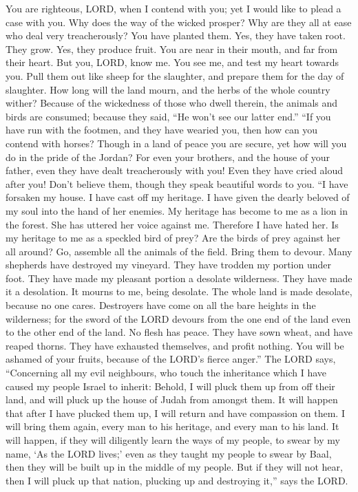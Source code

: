  You are righteous, LORD, when I contend with you; yet I
would like to plead a case with you. Why does the way of the wicked
prosper? Why are they all at ease who deal very treacherously?
 You have planted them. Yes, they have taken root. They
grow. Yes, they produce fruit. You are near in their mouth, and far from
their heart.  But you, LORD, know me. You see me, and test
my heart towards you. Pull them out like sheep for the slaughter, and
prepare them for the day of slaughter.  How long will the
land mourn, and the herbs of the whole country wither? Because of the
wickedness of those who dwell therein, the animals and birds are
consumed; because they said, ``He won't see our latter end.''
 ``If you have run with the footmen, and they have wearied
you, then how can you contend with horses? Though in a land of peace you
are secure, yet how will you do in the pride of the Jordan?
 For even your brothers, and the house of your father,
even they have dealt treacherously with you! Even they have cried aloud
after you! Don't believe them, though they speak beautiful words to you.
 ``I have forsaken my house. I have cast off my heritage.
I have given the dearly beloved of my soul into the hand of her enemies.
 My heritage has become to me as a lion in the forest. She
has uttered her voice against me. Therefore I have hated her.
 Is my heritage to me as a speckled bird of prey? Are the
birds of prey against her all around? Go, assemble all the animals of
the field. Bring them to devour.  Many shepherds have
destroyed my vineyard. They have trodden my portion under foot. They
have made my pleasant portion a desolate wilderness. 
They have made it a desolation. It mourns to me, being desolate. The
whole land is made desolate, because no one cares. 
Destroyers have come on all the bare heights in the wilderness; for the
sword of the LORD devours from the one end of the land even to the other
end of the land. No flesh has peace.  They have sown
wheat, and have reaped thorns. They have exhausted themselves, and
profit nothing. You will be ashamed of your fruits, because of the
LORD's fierce anger.''  The LORD says, ``Concerning all
my evil neighbours, who touch the inheritance which I have caused my
people Israel to inherit: Behold, I will pluck them up from off their
land, and will pluck up the house of Judah from amongst them.
 It will happen that after I have plucked them up, I will
return and have compassion on them. I will bring them again, every man
to his heritage, and every man to his land.  It will
happen, if they will diligently learn the ways of my people, to swear by
my name, `As the LORD lives;' even as they taught my people to swear by
Baal, then they will be built up in the middle of my people.
 But if they will not hear, then I will pluck up that
nation, plucking up and destroying it,'' says the LORD.


